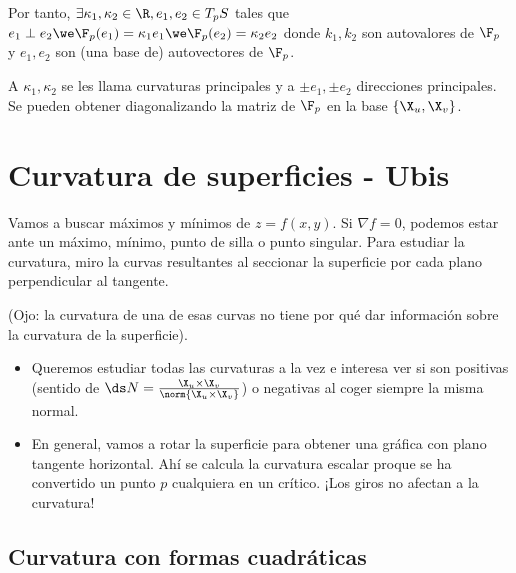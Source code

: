 Por tanto, $\exists \kappa_1, \kappa_2 \in \R, e_1, e_2 \in T_pS$ tales que $e_1 \perp e_2 \we \F_p(e_1) = \kappa_1e_1 \we \F_p(e_2) = \kappa_2e_2$ donde $k_1, k_2$ son autovalores de $\F_p$ y $e_1, e_2$ son (una base de) autovectores de $\F_p$.

A $\kappa_1, \kappa_2$ se les llama curvaturas principales y a $\pm e_1, \pm e_2$ direcciones principales. Se pueden obtener diagonalizando la matriz de $\F_p$ en la base $\{\X_u, \X_v\}$.

\pagebreak
\section{Curvatura de superficies - Ubis}

Vamos a buscar máximos y mínimos de $z = f(x,y)$. Si $\nabla f = 0$, podemos estar ante un máximo, mínimo, punto de silla o punto singular. Para estudiar la curvatura, miro la curvas resultantes al seccionar la superficie por cada plano perpendicular al tangente.

(Ojo: la curvatura de una de esas curvas no tiene por qué dar información sobre la curvatura de la superficie).

\begin{itemize}
	\item Queremos estudiar todas las curvaturas a la vez e interesa ver si son positivas (sentido de $\ds N=\frac{\X_u\times\X_v}{\norm{\X_u\times\X_v}}$) o negativas al coger siempre la misma normal.
	\item En general, vamos a rotar la superficie para obtener una gráfica con plano tangente horizontal. Ahí se calcula la curvatura escalar proque se ha convertido un punto $p$ cualquiera en un crítico. ¡Los giros no afectan a la curvatura!
\end{itemize}

\subsection{Curvatura con formas cuadráticas}

